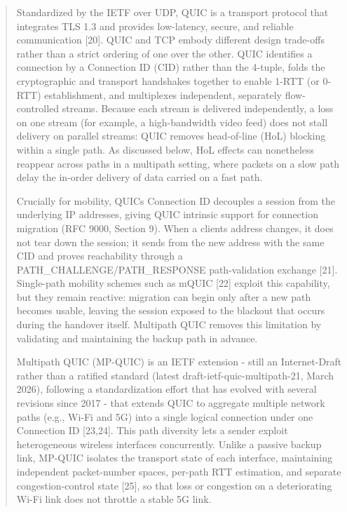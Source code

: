 \begin{quote}
Standardized by the IETF over UDP, QUIC is a transport protocol that integrates TLS 1.3 and provides low-latency, secure, and reliable communication {[}20{]}. QUIC and TCP embody different design trade-offs rather than a strict ordering of one over the other. QUIC identifies a connection by a Connection ID (CID) rather than the 4-tuple, folds the cryptographic and transport handshakes together to enable 1-RTT (or 0-RTT) establishment, and multiplexes independent, separately flow-controlled streams. Because each stream is delivered independently, a loss on one stream (for example, a high-bandwidth video feed) does not stall delivery on parallel streams: QUIC removes head-of-line (HoL) blocking within a single path. As discussed below, HoL effects can nonetheless reappear across paths in a multipath setting, where packets on a slow path delay the in-order delivery of data carried on a fast path.

Crucially for mobility, QUIC\textquotesingle s Connection ID decouples a session from the underlying IP addresses, giving QUIC intrinsic support for connection migration (RFC 9000, Section 9). When a client\textquotesingle s address changes, it does not tear down the session; it sends from the new address with the same CID and proves reachability through a PATH\_CHALLENGE/PATH\_RESPONSE path-validation exchange {[}21{]}. Single-path mobility schemes such as mQUIC {[}22{]} exploit this capability, but they remain reactive: migration can begin only after a new path becomes usable, leaving the session exposed to the blackout that occurs during the handover itself. Multipath QUIC removes this limitation by validating and maintaining the backup path in advance.

Multipath QUIC (MP-QUIC) is an IETF extension - still an Internet-Draft rather than a ratified standard (latest draft-ietf-quic-multipath-21, March 2026), following a standardization effort that has evolved with several revisions since 2017 - that extends QUIC to aggregate multiple network paths (e.g., Wi-Fi and 5G) into a single logical connection under one Connection ID {[}23,24{]}. This path diversity lets a sender exploit heterogeneous wireless interfaces concurrently. Unlike a passive backup link, MP-QUIC isolates the transport state of each interface, maintaining independent packet-number spaces, per-path RTT estimation, and separate congestion-control state {[}25{]}, so that loss or congestion on a deteriorating Wi-Fi link does not throttle a stable 5G link.


\end{quote}
